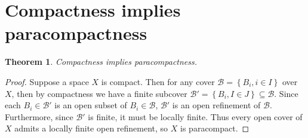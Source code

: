 \documentclass{article}
\newtheorem{theorem}[subsection]{Theorem}
\theoremstyle{definition}
\newcommand{\set}[1]{\left\{#1\right\}}
\begin{document}
\section{Compactness implies paracompactness}
\begin{theorem}
Compactness implies paracompactness.
\end{theorem}
\begin{proof}
Suppose a space $X$ is compact. Then for any cover $\mathcal{B}
=\set{B_i, i\in I}$ over $X$,
then by compactness we have a finite subcover 
$\mathcal{B}'=\set{B_i, I\in J} \subseteq \mathcal{B}$. Since each 
$B_i \in \mathcal{B}'$ is an open subset of $B_i \in \mathcal{B}$, 
$\mathcal{B}'$ is an open refinement of $\mathcal{B}$. Furthermore, since
$\mathcal{B}'$ is finite, it must be locally finite. Thus
every open cover of $X$ admits a locally finite open refinement, so $X$
is paracompact.
\end{proof}
\end{document}
